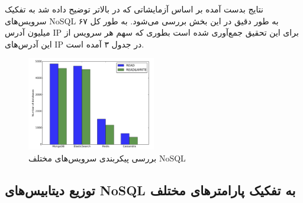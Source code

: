\documentclass[10pt, a4paper]{article}
\begin{document}
نتایج بدست آمده بر اساس آزمایشاتی که در بالاتر توضیح داده شد به تفکیک سرویس‌های
NoSQL به طور دقیق در این بخش بررسی می‌شود. به طور کل ۶۷ میلیون آدرس IP برای این
تحقیق جمع‌آوری شده است بطوری که سهم هر سرویس از این آدرس‌های IP در جدول ۳ آمده
است.

\begin{LTR}
    \begin{table}[h]
        \centering
        \begin{RTL}
            \caption{آدرس‌های IP یافت شده بین بازه اکتبر ۲۰۱۹ تا مارچ ۲۰۲۰}
        \end{RTL}
    \end{table}
\end{LTR}

\begin{figure}[H]
    \centering
    \includegraphics[width=0.5\textwidth]{res/a.png}
    \caption{بررسی پیکربندی سرویس‌های مختلف NoSQL}
    \label{fig: diagram}
\end{figure}

\subsection{توزیع دیتابیس‌های NoSQL به تفکیک پارامتر‌های مختلف}
\end{document}
